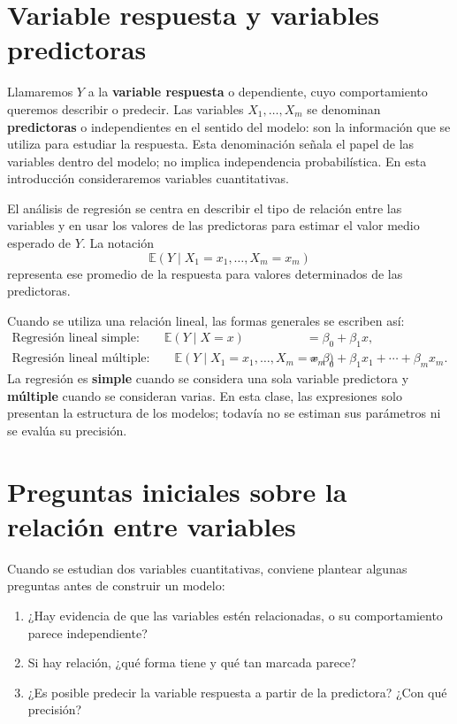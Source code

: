\section{Variable respuesta y variables predictoras}

Llamaremos $Y$ a la \textbf{variable respuesta} o dependiente, cuyo comportamiento queremos describir o predecir. Las variables $X_1,\ldots,X_m$ se denominan \textbf{predictoras} o independientes en el sentido del modelo: son la información que se utiliza para estudiar la respuesta. Esta denominación señala el papel de las variables dentro del modelo; no implica independencia probabilística. En esta introducción consideraremos variables cuantitativas.

El análisis de regresión se centra en describir el tipo de relación entre las variables y en usar los valores de las predictoras para estimar el valor medio esperado de $Y$. La notación
\[
\mathbb{E}(Y\mid X_1=x_1,\ldots,X_m=x_m)
\]
representa ese promedio de la respuesta para valores determinados de las predictoras.

Cuando se utiliza una relación lineal, las formas generales se escriben así:
\begin{align*}
\text{Regresión lineal simple:}\qquad
\mathbb{E}(Y\mid X=x)&=\beta_0+\beta_1x,\\
\text{Regresión lineal múltiple:}\qquad
\mathbb{E}(Y\mid X_1=x_1,\ldots,X_m=x_m)&=\beta_0+\beta_1x_1+\cdots+\beta_mx_m.
\end{align*}
La regresión es \textbf{simple} cuando se considera una sola variable predictora y \textbf{múltiple} cuando se consideran varias. En esta clase, las expresiones solo presentan la estructura de los modelos; todavía no se estiman sus parámetros ni se evalúa su precisión.

\section{Preguntas iniciales sobre la relación entre variables}

Cuando se estudian dos variables cuantitativas, conviene plantear algunas preguntas antes de construir un modelo:

\begin{enumerate}
    \item ¿Hay evidencia de que las variables estén relacionadas, o su comportamiento parece independiente?
    \item Si hay relación, ¿qué forma tiene y qué tan marcada parece?
    \item ¿Es posible predecir la variable respuesta a partir de la predictora? ¿Con qué precisión?
\end{enumerate}

